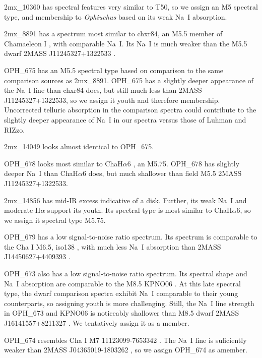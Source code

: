 \documentclass[12pt,preprint]{aastex}
\begin{document}
2mx\_10360 has spectral features very similar to T50, so we assign an M5 spectral type, and membership to \emph{Ophiuchus} based on its weak Na~I absorption.

2mx\_8891 has a spectrum most similar to chxr84, an M5.5 member of Chamaeleon I \citep{2004ApJ...602..816L}, with comparable Na~I.  Its Na~I is much weaker than the M5.5 dwarf 2MASS J11245327+1322533 \citep{2003AJ....126.2421C}.

OPH\_675 has an M5.5 spectral type based on comparison to the same comparison sources as 2mx\_8891.  OPH\_675 has a slightly deeper appearance of the Na~I line than chxr84 does, but still much less than 2MASS J11245327+1322533, so we assign it youth and therefore membership.  Uncorrected telluric absorption in the comparison spectra could contribute to the slightly deeper appearance of Na~I in our spectra versus those of Luhman and RIZzo.  

2mx\_14049 looks almost identical to OPH\_675.

OPH\_678 looks most similar to ChaH$\alpha$6 \citep{2004ApJ...602..816L}, an M5.75.  OPH\_678 has slightly deeper Na~I than ChaH$\alpha$6 does, but much shallower than field M5.5 2MASS J11245327+1322533.  

2mx\_14856 has mid-IR excess indicative of a disk.  Further, its weak Na~I and moderate H$\alpha$ support its youth.  Its spectral type is most similar to ChaH$\alpha$6, so we assign it spectral type M5.75.

OPH\_679 has a low signal-to-noise ratio spectrum.  Its spectrum is comparable to the Cha I M6.5, iso138 \citep{2004ApJ...602..816L}, with much less Na~I absorption than 2MASS J14450627+4409393 \citep{2003AJ....126.2421C}.  

OPH\_673 also has a low signal-to-noise ratio spectrum.  Its spectral shape and Na~I absorption are comparable to the M8.5 KPNO06 \citep{1998AJ....115.2074B,2003ApJ...593.1093L}.  At this late spectral type, the dwarf comparison spectra exhibit Na~I comparable to their young counterparts, so assigning youth is more challenging.  Still, the Na~I line strength in OPH\_673 and KPNO06 is noticeably shallower than M8.5 dwarf 2MASS J16141557+8211327 \citep{2007AJ....133..439C}.  We tentatively assign it as a member.

OPH\_674 resembles Cha I M7 11123099-7653342 \citep{2004ApJ...602..816L}.  The Na~I line is suficiently weaker than 2MASS J04365019-1803262 \citep{2007AJ....133..439C}, so we assign OPH\_674 as amember.  
\end{document}
